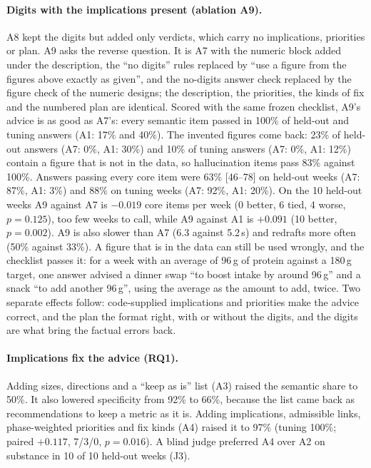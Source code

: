 \documentclass[10pt,twocolumn]{article}
\begin{document}
\paragraph{Digits with the implications present (ablation A9).} A8 kept the digits but added only verdicts, which carry
no implications, priorities or plan. A9 asks the reverse question. It is A7 with the numeric block added under the
description, the ``no digits'' rules replaced by ``use a figure from the figures above exactly as given'', and the
no-digits answer check replaced by the figure check of the numeric designs; the description, the priorities, the kinds
of fix and the numbered plan are identical. Scored with the same frozen checklist, A9's advice is as good as A7's:
every semantic item passed in 100\% of held-out and tuning answers (A1: 17\% and 40\%). The invented figures come
back: 23\% of held-out answers (A7: 0\%, A1: 30\%) and 10\% of tuning answers (A7: 0\%, A1: 12\%) contain a figure that
is not in the data, so hallucination items pass 83\% against 100\%. Answers passing every core item were 63\%
[46--78] on held-out weeks (A7: 87\%, A1: 3\%) and 88\% on tuning weeks (A7: 92\%, A1: 20\%). On the 10 held-out weeks A9
against A7 is $-0.019$ core items per week (0 better, 6 tied, 4 worse, $p=0.125$), too few weeks to call, while A9
against A1 is $+0.091$ (10 better, $p=0.002$). A9 is also slower than A7 (6.3 against 5.2\,s) and redrafts more often
(50\% against 33\%). A figure that is in the data can still be used wrongly, and the checklist passes it: for a week
with an average of 96\,g of protein against a 180\,g target, one answer advised a dinner swap ``to boost intake by around
96\,g'' and a snack ``to add another 96\,g'', using the average as the amount to add, twice.
Two separate effects follow: code-supplied implications and priorities make the advice correct, and the plan the format
right, with or without the digits, and the digits are what bring the factual errors back.

\paragraph{Implications fix the advice (RQ1).} Adding sizes, directions and a ``keep as is'' list (A3) raised the
semantic share to 50\%. It also lowered specificity from 92\% to 66\%, because the list came back as recommendations
to keep a metric as it is. Adding implications, admissible links, phase-weighted priorities and fix kinds (A4) raised
it to 97\% (tuning 100\%; paired $+0.117$, 7/3/0, $p=0.016$). A blind judge preferred A4 over A2 on substance in 10
of 10 held-out weeks (J3).
\end{document}
